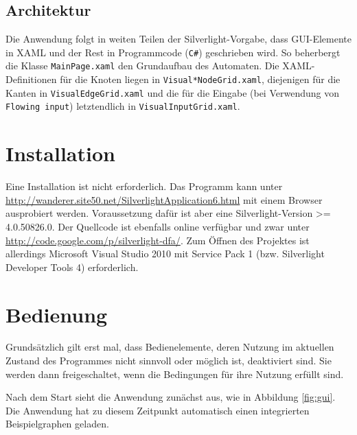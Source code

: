 \subsection{Architektur}

Die Anwendung folgt in weiten Teilen der Silverlight-Vorgabe, dass GUI-Elemente
in XAML und der Rest in Programmcode (\verb:C#:) geschrieben wird. So
beherbergt die Klasse \texttt{MainPage.xaml} den Grundaufbau des Automaten. Die
XAML-Definitionen für die Knoten liegen in \texttt{Visual*NodeGrid.xaml}, diejenigen für
die Kanten in \texttt{VisualEdgeGrid.xaml} und die für die Eingabe (bei Verwendung von
\texttt{Flowing input}) letztendlich in \texttt{VisualInputGrid.xaml}.

\section{Installation}


Eine Installation ist nicht erforderlich. Das Programm kann unter
\url{http://wanderer.site50.net/SilverlightApplication6.html} mit einem Browser
ausprobiert werden. Voraussetzung dafür ist aber eine Silverlight-Version >=
4.0.50826.0. Der Quellcode ist ebenfalls online verfügbar und zwar unter
\url{http://code.google.com/p/silverlight-dfa/}. Zum Öffnen des Projektes ist
allerdings Microsoft Visual Studio 2010 mit Service Pack 1 (bzw. Silverlight
Developer Tools 4) erforderlich.

\section{Bedienung}

Grundsätzlich gilt erst mal, dass Bedienelemente, deren Nutzung im aktuellen
Zustand des Programmes nicht sinnvoll oder möglich ist, deaktiviert sind. Sie
werden dann freigeschaltet, wenn die Bedingungen für ihre Nutzung erfüllt sind.

Nach dem Start sieht die Anwendung zunächst aus, wie in Abbildung \ref{fig:gui}. Die
Anwendung hat zu diesem Zeitpunkt automatisch einen integrierten
Beispielgraphen geladen.

